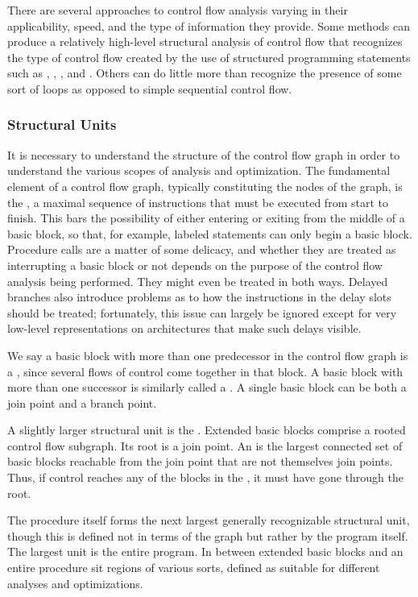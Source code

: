 There are several approaches to control flow analysis varying in their applicability, speed, and the type of information they provide. Some methods can produce a relatively high-level structural analysis of control flow that recognizes the type of control flow created by the use of structured programming statements such as , , , and . Others can do little more than recognize the presence of some sort of loops as opposed to simple sequential control flow.

\subsubsection{Structural Units}
It is necessary to understand the structure of the control flow graph in order to understand the various scopes of analysis and optimization. The fundamental element of a control flow graph, typically constituting the nodes of the graph, is the , a maximal sequence of instructions that must be executed from start to finish. This bars the possibility of either entering or exiting from the middle of a basic block, so that, for example, labeled statements can only begin a basic block. Procedure calls are a matter of some delicacy, and whether they are treated as interrupting a basic block or not depends on the purpose of the control flow analysis being performed. They might even be treated in both ways. Delayed branches also introduce problems as to how the instructions in the delay slots should be treated; fortunately, this issue can largely be ignored except for very low-level representations on architectures that make such delays visible.

We say a basic block with more than one predecessor in the control flow graph is a , since several flows of control come together in that block. A basic block with more than one successor is similarly called a . A single basic block can be both a join point and a branch point.

A slightly larger structural unit is the . Extended basic blocks comprise a rooted control flow subgraph. Its root is a join point. An  is the largest connected set of basic blocks reachable from the join point that are not themselves join points. Thus, if control reaches any of the blocks in the , it must have gone through the root.

The procedure itself forms the next largest generally recognizable structural unit, though this is defined not in terms of the graph but rather by the program itself. The largest unit is the entire program. In between extended basic blocks and an entire procedure sit regions of various sorts, defined as suitable for different analyses and optimizations.

